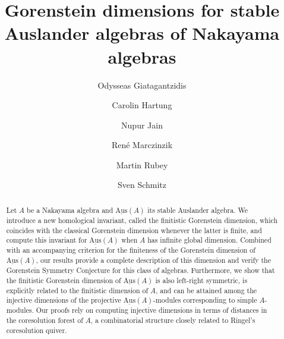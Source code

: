 \documentclass[a4paper]{amsart}
\theoremstyle{definition}
\theoremstyle{remark}
\numberwithin{equation}{theorem}
\newcommand{\sAus}{\operatorname{\underline{Aus}}}
\begin{document}
\title[Gorenstein dimensions of stable Auslander algebras]{Gorenstein dimensions for stable Auslander algebras of Nakayama algebras}
\date{}

\author[Giatagantzidis]{Odysseas Giatagantzidis}
\address[Giatagantzidis]{???}

\author[Hartung]{Carolin Hartung}
\address[Hartung]{Mathematical Institute of the University of Bonn, Germany}

\author[Jain]{Nupur Jain}
\address[Jain]{Fakult\"at f\"ur Mathematik, Ruhr-Universit\"at Bochum, Germany}

\author[Marczinzik]{Ren\'e Marczinzik}
\address[Marczinzik]{Mathematical Institute of the University of Bonn, Germany}

\author[Rubey]{Martin Rubey}
\address[Rubey]{Fakult\"at f\"ur Mathematik und Geoinformation, TU Wien, Austria}

\author[Schmitz]{Sven Schmitz}
\address[Schmitz]{Mathematical Institute of the University of Bonn, Germany}



\begin{abstract}
Let $A$ be a Nakayama algebra and $\sAus(A)$ its stable Auslander algebra. We introduce a new homological invariant, called the finitistic Gorenstein dimension, which coincides with the classical Gorenstein dimension whenever the latter is finite, and compute this invariant for $\sAus(A)$ when $A$ has infinite global dimension. Combined with an accompanying criterion for the finiteness of the Gorenstein dimension of $\sAus(A)$, our results provide a complete description of this dimension and verify the Gorenstein Symmetry Conjecture for this class of algebras. Furthermore, we show that the finitistic Gorenstein dimension of $ \sAus(A) $ is also left-right symmetric, is explicitly related to the finitistic dimension of $ A $, and can be attained among the injective dimensions of the projective $ \sAus(A) $-modules corresponding to simple $A$-modules. Our proofs rely on computing injective dimensions in terms of distances in the coresolution forest of $A$, a combinatorial structure closely related to Ringel's coresolution quiver.
\end{abstract}
\maketitle
\end{document}
